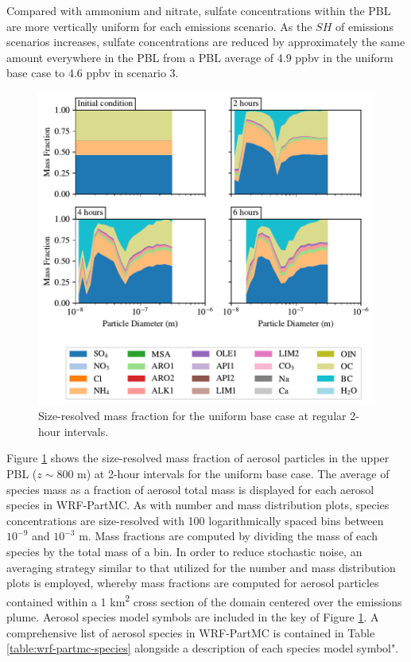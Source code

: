 Compared with ammonium and nitrate, sulfate concentrations within the PBL are more vertically uniform for each emissions scenario. As the $SH$ of emissions scenarios increases, sulfate concentrations are reduced by approximately the same amount everywhere in the PBL from a PBL average of 4.9 ppbv in the uniform base case to 4.6 ppbv in scenario 3. 

\begin{figure}[!t]
  \centering
    \includegraphics[width=\textwidth]{figures/chapter5/speciated-mass-frac-four-panel-uniform-basecase-z40.pdf}
    \caption{Size-resolved mass fraction for the uniform base case at regular 2-hour intervals.}
    \label{fig:mass-frac-ub}
\end{figure}

Figure \ref{fig:mass-frac-ub} shows the size-resolved mass fraction of aerosol particles in the upper PBL ($z\sim800$ m) at 2-hour intervals for the uniform base case. The average of species mass as a fraction of aerosol total mass is displayed for each aerosol species in WRF-PartMC. As with number and mass distribution plots, species concentrations are size-resolved with 100 logarithmically spaced bins between $10^{-9}$ and $10^{-3}$ m. Mass fractions are computed by dividing the mass of each species by the total mass of a bin. In order to reduce stochastic noise, an averaging strategy similar to that utilized for the number and mass distribution plots is employed, whereby mass fractions are computed for aerosol particles contained within a 1 \si{km^2} cross section of the domain centered over the emissions plume. Aerosol species model symbols are included in the key of Figure \ref{fig:mass-frac-ub}. A comprehensive list of aerosol species in WRF-PartMC is contained in Table \ref{table:wrf-partmc-species} alongside a description of each species model symbol". 

